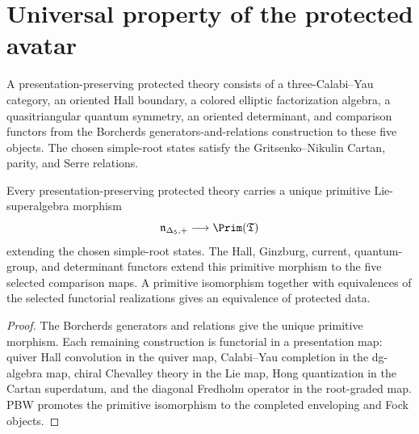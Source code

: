 \chapter{Universal property of the protected avatar}
A presentation-preserving protected theory consists of a three-Calabi--Yau category, an oriented Hall boundary, a colored elliptic factorization algebra, a quasitriangular quantum symmetry, an oriented determinant, and comparison functors from the Borcherds generators-and-relations construction to these five objects.  The chosen simple-root states satisfy the Gritsenko--Nikulin Cartan, parity, and Serre relations.

\begin{theorem}
Every presentation-preserving protected theory carries a unique primitive Lie-superalgebra morphism
\[
 \nIg\longrightarrow\Prim(\mathfrak T)
\]
extending the chosen simple-root states.  The Hall, Ginzburg, current, quantum-group, and determinant functors extend this primitive morphism to the five selected comparison maps.  A primitive isomorphism together with equivalences of the selected functorial realizations gives an equivalence of protected data.
\end{theorem}
\begin{proof}
The Borcherds generators and relations give the unique primitive morphism.  Each remaining construction is functorial in a presentation map: quiver Hall convolution in the quiver map, Calabi--Yau completion in the dg-algebra map, chiral Chevalley theory in the Lie map, Hong quantization in the Cartan superdatum, and the diagonal Fredholm operator in the root-graded map.  PBW promotes the primitive isomorphism to the completed enveloping and Fock objects.
\end{proof}

